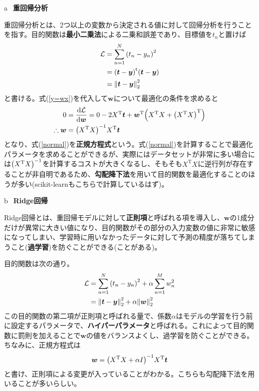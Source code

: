 \documentclass[uplatex,12pt,dvipdfmx]{jsarticle}
\begin{document}
\noindent\textcircled{a}~\textbf{重回帰分析}

重回帰分析とは、2つ以上の変数から決定される値に対して回帰分析を行うことを指す。目的関数は\textbf{最小二乗法}による二乗和誤差であり、目標値を$t_n$と置けば
\begin{align}
    \mathcal{L}&=\sum_{n=1}^{N}\qty(t_n-y_n)^2 \\
    &=\qty(\bm{t}-\bm{y})^{\mathrm{t}}\qty(\bm{t}-\bm{y}) \\
    &=\norm{\bm{t}-\bm{y}}^2_2
\end{align}
と書ける。式(\ref{y=wx})を代入して$\bm{w}$について最適化の条件を求めると
\begin{align}
    0&=\dv{\mathcal{L}}{\bm{w}}=0-2X^{\mathrm{T}}\bm{t}+\bm{w}^{\mathrm{T}}\qty(X^{\mathrm{T}}X+\qty(X^{\mathrm{T}}X)^{\mathrm{T}}) \\
    \label{normal}\therefore \bm{w}&=\qty(X^{\mathrm{T}}X)^{-1}X^{\mathrm{T}}\bm{t}
\end{align}
となり、式(\ref{normal})を\textbf{正規方程式}という。式(\ref{normal})を計算することで最適化パラメータを求めることができるが、実際にはデータセットが非常に多い場合には$\qty(X^{\mathrm{T}}X)^{-1}$を計算するコストが大きくなるし、そもそも$X^{\mathrm{T}}X$に逆行列が存在することが非自明であるため、\textbf{勾配降下法}を用いて目的関数を最適化することのほうが多い(scikit-learnもこちらで計算しているはず)。

\noindent\textcircled{b}~\textbf{Ridge回帰}

Ridge回帰とは、重回帰モデルに対して\textbf{正則項}と呼ばれる項を導入し、$\bm{w}$の1成分だけが異常に大きい値になり、目的関数がその部分の入力変数の値に非常に敏感になってしまい、学習時に用いなかったデータに対して予測の精度が落ちてしまうこと(\textbf{過学習})を防ぐことができる(ことがある)。

目的関数は次の通り。
\begin{align}
    \mathcal{L}&=\sum_{n=1}^{N}\qty(t_n-y_n)^2+\alpha\sum_{n=1}^{M}w_n^2 \\
    &=\norm{\bm{t}-\bm{y}}^2_2+\alpha\norm{\bm{w}}_2^2 
\end{align}
この目的関数の第二項が正則項と呼ばれる量で、係数$\alpha$はモデルの学習を行う前に設定するパラメータで、\textbf{ハイパーパラメータ}と呼ばれる。これによって目的関数に罰則を加えることで$\bm{w}$の値をバランスよくし、過学習を防ぐことができる。ちなみに、正規方程式は
\begin{align}
    \bm{w}=\qty(X^{\mathrm{T}}X+\alpha I)^{-1}X^{\mathrm{T}}\bm{t}
\end{align}
と書け、正則項による変更が入っていることがわかる。こちらも勾配降下法を用いることが多いらしい。
\end{document}
